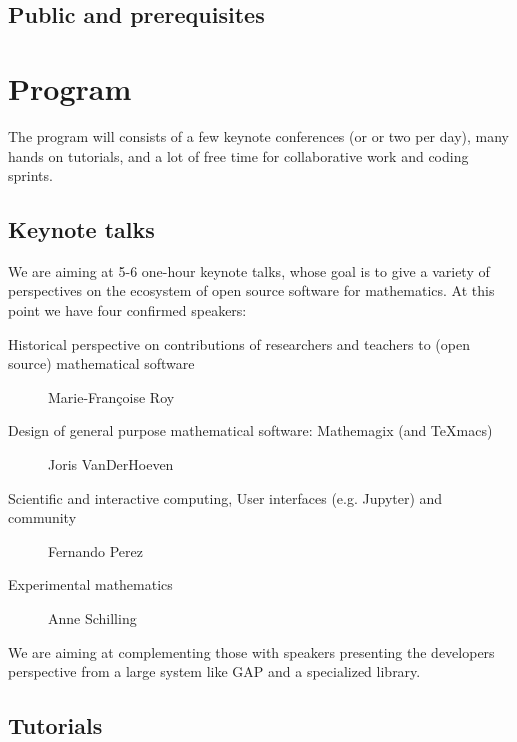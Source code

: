 \documentclass[12pt]{amsbook}
\begin{document}
\subsection{Public and prerequisites}



\section{Program}

The program will consists of a few keynote conferences (or or two per
day), many hands on tutorials, and a lot of free time for
collaborative work and coding sprints.

\subsection{Keynote talks}

We are aiming at 5-6 one-hour keynote talks, whose goal is to give a
variety of perspectives on the ecosystem of open source software for
mathematics. At this point we have four confirmed speakers:

\begin{description}
\item[Historical perspective on contributions of researchers and
  teachers to (open source) mathematical software]
  Marie-Françoise Roy
\item[Design of general purpose mathematical software: Mathemagix (and TeXmacs)]
  Joris VanDerHoeven
\item[Scientific and interactive computing, User interfaces (e.g. Jupyter) and community]
  Fernando Perez
\item[Experimental mathematics]
  Anne Schilling
\end{description}

We are aiming at complementing those with speakers presenting the
developers perspective from a large system like GAP and a specialized
library.

\subsection{Tutorials}
\end{document}
